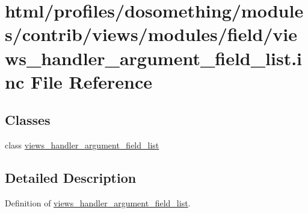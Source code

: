 \hypertarget{views__handler__argument__field__list_8inc}{
\section{html/profiles/dosomething/modules/contrib/views/modules/field/views\_\-handler\_\-argument\_\-field\_\-list.inc File Reference}
\label{views__handler__argument__field__list_8inc}
}
\subsection*{Classes}
\begin{DoxyCompactItemize}
\item 
class \hyperlink{classviews__handler__argument__field__list}{views\_\-handler\_\-argument\_\-field\_\-list}
\end{DoxyCompactItemize}


\subsection{Detailed Description}
Definition of \hyperlink{classviews__handler__argument__field__list}{views\_\-handler\_\-argument\_\-field\_\-list}. 